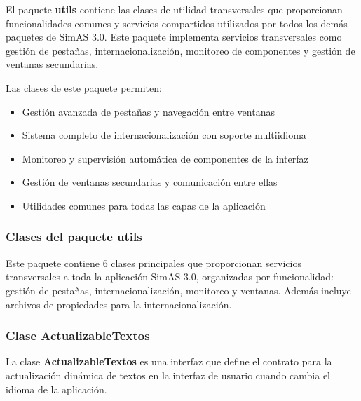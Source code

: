 El paquete \textbf{utils} contiene las clases de utilidad transversales que proporcionan funcionalidades comunes y servicios compartidos utilizados por todos los demás paquetes de SimAS 3.0. Este paquete implementa servicios transversales como gestión de pestañas, internacionalización, monitoreo de componentes y gestión de ventanas secundarias.

Las clases de este paquete permiten:
\begin{itemize}
    \item Gestión avanzada de pestañas y navegación entre ventanas
    \item Sistema completo de internacionalización con soporte multiidioma
    \item Monitoreo y supervisión automática de componentes de la interfaz
    \item Gestión de ventanas secundarias y comunicación entre ellas
    \item Utilidades comunes para todas las capas de la aplicación
\end{itemize}

\subsubsection{Clases del paquete utils}

Este paquete contiene 6 clases principales que proporcionan servicios transversales a toda la aplicación SimAS 3.0, organizadas por funcionalidad: gestión de pestañas, internacionalización, monitoreo y ventanas. Además incluye archivos de propiedades para la internacionalización.

\subsubsection{Clase ActualizableTextos}

La clase \textbf{ActualizableTextos} es una interfaz que define el contrato para la actualización dinámica de textos en la interfaz de usuario cuando cambia el idioma de la aplicación.

